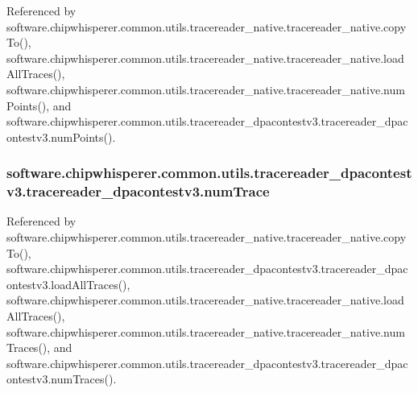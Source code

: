 Referenced by software.\+chipwhisperer.\+common.\+utils.\+tracereader\+\_\+native.\+tracereader\+\_\+native.\+copy\+To(), software.\+chipwhisperer.\+common.\+utils.\+tracereader\+\_\+native.\+tracereader\+\_\+native.\+load\+All\+Traces(), software.\+chipwhisperer.\+common.\+utils.\+tracereader\+\_\+native.\+tracereader\+\_\+native.\+num\+Points(), and software.\+chipwhisperer.\+common.\+utils.\+tracereader\+\_\+dpacontestv3.\+tracereader\+\_\+dpacontestv3.\+num\+Points().

\hypertarget{classsoftware_1_1chipwhisperer_1_1common_1_1utils_1_1tracereader__dpacontestv3_1_1tracereader__dpacontestv3_affc3222736ab6ef8dfc06a6062e33953}{}
\subsubsection[{num\+Trace}]{\setlength{\rightskip}{0pt plus 5cm}software.\+chipwhisperer.\+common.\+utils.\+tracereader\+\_\+dpacontestv3.\+tracereader\+\_\+dpacontestv3.\+num\+Trace}\label{classsoftware_1_1chipwhisperer_1_1common_1_1utils_1_1tracereader__dpacontestv3_1_1tracereader__dpacontestv3_affc3222736ab6ef8dfc06a6062e33953}


Referenced by software.\+chipwhisperer.\+common.\+utils.\+tracereader\+\_\+native.\+tracereader\+\_\+native.\+copy\+To(), software.\+chipwhisperer.\+common.\+utils.\+tracereader\+\_\+dpacontestv3.\+tracereader\+\_\+dpacontestv3.\+load\+All\+Traces(), software.\+chipwhisperer.\+common.\+utils.\+tracereader\+\_\+native.\+tracereader\+\_\+native.\+load\+All\+Traces(), software.\+chipwhisperer.\+common.\+utils.\+tracereader\+\_\+native.\+tracereader\+\_\+native.\+num\+Traces(), and software.\+chipwhisperer.\+common.\+utils.\+tracereader\+\_\+dpacontestv3.\+tracereader\+\_\+dpacontestv3.\+num\+Traces().

\hypertarget{classsoftware_1_1chipwhisperer_1_1common_1_1utils_1_1tracereader__dpacontestv3_1_1tracereader__dpacontestv3_a4aa518e20136f4480ad3fec31fcc7cbe}{}

